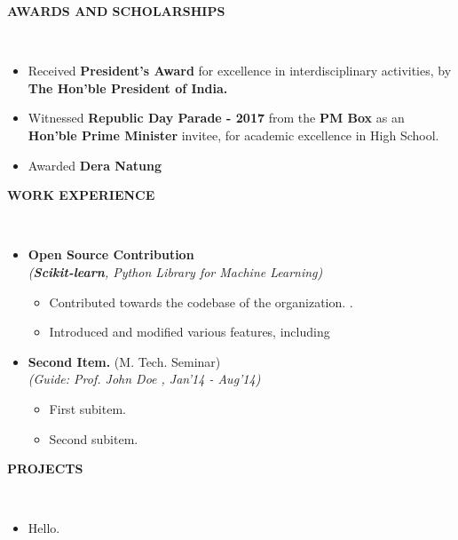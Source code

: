 \documentclass[a4paper,10pt]{article}
\newcommand{\isep}{-2 pt}
\newcommand{\lsep}{-0.5cm}
\newcommand{\resheading}[1]{{\small \colorbox{mygrey}{\begin{minipage}{0.975\textwidth}{\textbf{#1 \vphantom{p\^{E}}}}\end{minipage}}}}
\begin{document}
\resheading{\textbf{AWARDS AND SCHOLARSHIPS} }\\[\lsep]
\begin{itemize}
\item \noindent Received \textbf{President's Award} for excellence in interdisciplinary activities, by \textbf{The Hon'ble President of India.}
\item \noindent Witnessed \textbf{Republic Day Parade - 2017} from the \textbf{PM Box} as an \textbf{Hon'ble Prime Minister} invitee, for academic excellence in High School.
\item \noindent Awarded \textbf{Dera Natung }
\end{itemize}

\resheading{\textbf{WORK EXPERIENCE} }\\[\lsep]
\begin{itemize}
\item \textbf{Open Source Contribution
}  \\
 \emph{(\textbf{Scikit-learn}, Python Library for Machine Learning)} \\[-0.6cm]
	\begin{itemize}\itemsep \isep
	\item Contributed towards the codebase of the organization.
.
	\item Introduced and modified various features, including 

	\end{itemize}

\item \textbf{Second Item.
} (M. Tech. Seminar) \\
 \emph{(Guide: Prof. John Doe
, Jan'14 - Aug'14)} \\[-0.6cm]
	\begin{itemize}\itemsep \isep
	\item First subitem.
	\item Second subitem.
	\end{itemize}
\end{itemize}

\resheading{\textbf{PROJECTS} }\\[\lsep]
\begin{itemize}
\item \noindent Hello.
\end{itemize}
\end{document}
